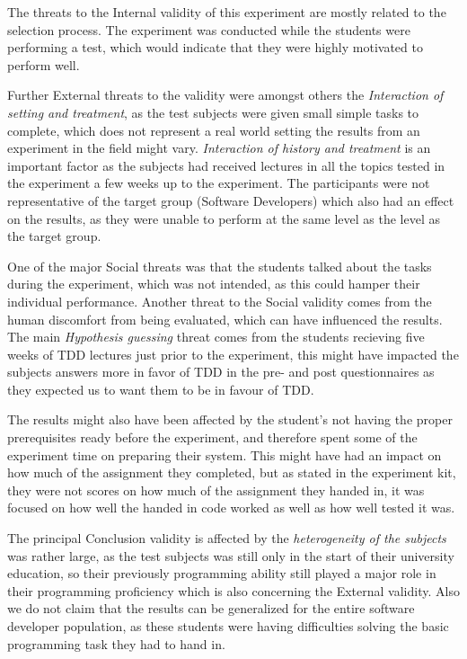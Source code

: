 \documentclass{sig-alternate-05-2015}
\begin{document}
The threats to the Internal validity of this experiment are mostly related to the selection process. The experiment was conducted while the students were performing a test, which would indicate that they were highly motivated to perform well.

Further External threats to the validity were amongst others the \textit{Interaction of setting and treatment}, as the test subjects were given small simple tasks to complete, which does not represent a real world setting the results from an experiment in the field might vary. \textit{Interaction of history and treatment} is an important factor as the subjects had received lectures in all the topics tested in the experiment a few weeks up to the experiment. The participants were not representative of the target group (Software Developers) which also had an effect on the results, as they were unable to perform at the same level as the level as the target group.

One of the major Social threats was that the students talked about the tasks during the experiment, which was not intended, as this could hamper their individual performance. Another threat to the Social validity comes from the human discomfort from being evaluated\cite{henchy1}, which can have influenced the results. The main \textit{Hypothesis guessing} threat comes from the students recieving five  weeks of TDD lectures just prior to the experiment, this might have impacted the subjects answers more in favor of TDD in the pre- and post questionnaires as they expected us to want them to be in favour of TDD. 

The results might also have been affected by the student's not having the proper prerequisites ready before the experiment, and therefore spent some of the experiment time on preparing their system. This might have had an impact on how much of the assignment they completed, but as stated in the experiment kit, they were not scores on how much of the assignment they handed in, it was focused on how well the handed in code worked as well as how well tested it was.

The principal Conclusion validity is affected by the \textit{heterogeneity of the subjects} was rather large, as the test subjects was still only in the start of their university education, so their previously programming ability still played a major role in their programming proficiency which is also concerning the External validity. Also we do not claim that the results can be generalized for the entire software developer population, as these students were having difficulties solving the basic programming task they had to hand in. 
\end{document}
